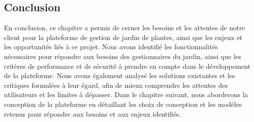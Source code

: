 \documentclass[a4paper,12pt,oneside]{article}
\begin{document}
\subsection{Conclusion}
En conclusion, ce chapitre a permis de cerner les besoins et les attentes de notre client pour la plateforme de gestion de jardin de plantes, ainsi que les enjeux et les opportunités liés à ce projet. Nous avons identifié les fonctionnalités nécessaires pour répondre aux besoins des gestionnaires du jardin, ainsi que les critères de performance et de sécurité à prendre en compte dans le développement de la plateforme. Nous avons également analysé les solutions existantes et les critiques formulées à leur égard, afin de mieux comprendre les attentes des utilisateurs et les limites à dépasser. Dans le chapitre suivant, nous aborderons la conception de la plateforme en détaillant les choix de conception et les modèles retenus pour répondre aux besoins et aux enjeux identifiés.
\newpage
\end{document}
